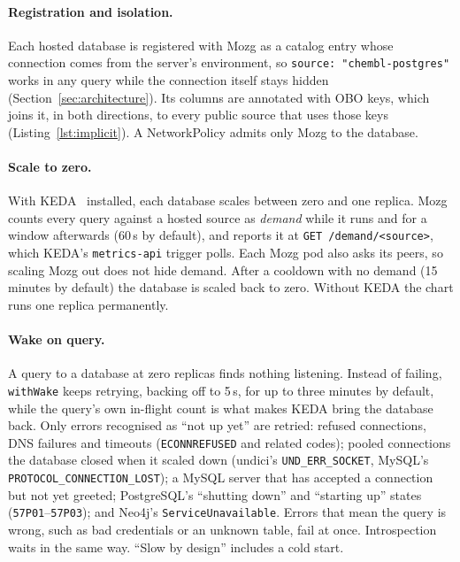 \documentclass[sigconf,nonacm]{acmart}
\begin{document}
\paragraph{Registration and isolation.}
Each hosted database is registered with Mozg as a catalog entry whose
connection comes from the server's environment, so
\texttt{source: "chembl-postgres"} works in any query while the
connection itself stays hidden (Section~\ref{sec:architecture}).  Its
columns are annotated with OBO keys, which joins it, in both
directions, to every public source that uses those keys
(Listing~\ref{lst:implicit}).  A NetworkPolicy admits only Mozg to the
database.

\paragraph{Scale to zero.}
With KEDA~\cite{keda} installed, each database scales between zero and
one replica.  Mozg counts every query against a hosted source as
\emph{demand} while it runs and for a window afterwards (60\,s by
default), and reports it at \texttt{GET /demand/<source>}, which KEDA's
\texttt{metrics-api} trigger polls.  Each Mozg pod also asks its peers,
so scaling Mozg out does not hide demand.  After a cooldown with no
demand (15 minutes by default) the database is scaled back to zero.
Without KEDA the chart runs one replica permanently.

\paragraph{Wake on query.}
A query to a database at zero replicas finds nothing listening.
Instead of failing, \texttt{withWake} keeps retrying, backing off to
5\,s, for up to three minutes by default, while the query's own
in-flight count is what makes KEDA bring the database back.  Only
errors recognised as ``not up yet'' are retried: refused connections,
DNS failures and timeouts (\texttt{ECONNREFUSED} and related codes);
pooled connections the database closed when it scaled down (undici's
\texttt{UND\_ERR\_SOCKET}, MySQL's \texttt{PROTOCOL\_CONNECTION\_LOST});
a MySQL server that has accepted a connection but not yet greeted;
PostgreSQL's ``shutting down'' and ``starting up'' states
(\texttt{57P01}--\texttt{57P03}); and Neo4j's
\texttt{ServiceUnavailable}.  Errors that mean the query is wrong, such
as bad credentials or an unknown table, fail at once.  Introspection
waits in the same way.  ``Slow by design'' includes a cold start.
\end{document}
